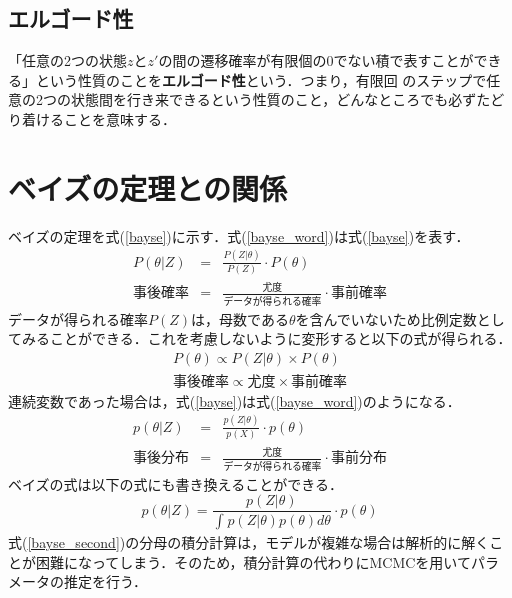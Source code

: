 \documentclass[11pt, a4paper]{jarticle}
\begin{document}
\subsection{エルゴード性}
「任意の2つの状態$z$と$z'$の間の遷移確率が有限個の0でない積で表すことができる」という性質のことを{\bf{エルゴード性}}という．つまり，有限回
のステップで任意の2つの状態間を行き来できるという性質のこと，どんなところでも必ずたどり着けることを意味する\cite{wakui}．

\section{ベイズの定理との関係}
ベイズの定理を式(\ref{bayse})に示す．式(\ref{bayse_word})は式(\ref{bayse})を表す．
\begin{eqnarray} 
	P(\theta|Z) &=& \frac{P(Z|\theta)}{P(Z)} \cdot P(\theta) \label{bayse} \\
	事後確率 &=& \frac{尤度}{データが得られる確率} \cdot 事前確率 \label{bayse_word}
\end{eqnarray}
データが得られる確率$P(Z)$は，母数である$\theta$を含んでいないため比例定数としてみることができる．これを考慮しないように変形すると以下の式が得られる．
\begin{eqnarray}
	P(\theta) \propto P(Z|\theta) \times P(\theta) \\
	事後確率 \propto 尤度 \times 事前確率
\end{eqnarray}
連続変数であった場合は，式(\ref{bayse})は式(\ref{bayse_word})のようになる．
\begin{eqnarray}
	p(\theta|Z) &=& \frac{p(Z|\theta)}{p(X)} \cdot p(\theta) \\
	事後分布 &=&  \frac{尤度}{データが得られる確率} \cdot 事前分布
\end{eqnarray}
ベイズの式は以下の式にも書き換えることができる．
\begin{equation} \label{bayse_second}
	p(\theta|Z) = \frac{p(Z|\theta)}{\int_{}^{} p(Z|\theta)p(\theta)d\theta} \cdot p(\theta)
\end{equation}
式(\ref{bayse_second})の分母の積分計算は，モデルが複雑な場合は解析的に解くことが困難になってしまう．そのため，積分計算の代わりにMCMCを用いてパラメータの推定を行う．

\end{document}
